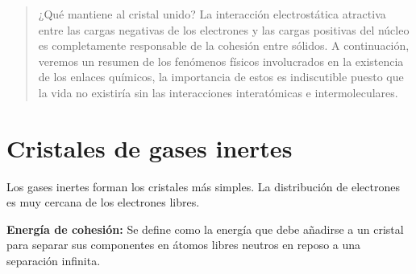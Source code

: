 \documentclass{article}
\begin{document}
\begin{titlepage}

\vfill
{}
\vfill
\hfill


\vfill





\hfill





\vfill
\vfill



\end{titlepage}

\newpage


\begin{abstract}
    ¿Qué mantiene al cristal unido? La interacción electrostática atractiva entre las cargas negativas de los electrones y las cargas positivas del núcleo es completamente responsable de la cohesión entre sólidos. A continuación, veremos un resumen de los fenómenos físicos involucrados en la existencia de los enlaces químicos, la importancia de estos es indiscutible puesto que la vida no existiría sin las interacciones interatómicas e intermoleculares.
\end{abstract}{}



\section{Cristales de gases inertes}
Los gases inertes forman los cristales más simples.  La distribución de electrones es muy cercana de los electrones libres.\cite{Kittel} 

\textbf{Energía de cohesión:} Se define como la energía que debe añadirse a un cristal para separar sus componentes en átomos libres neutros en reposo a una separación infinita.\\
\end{document}
